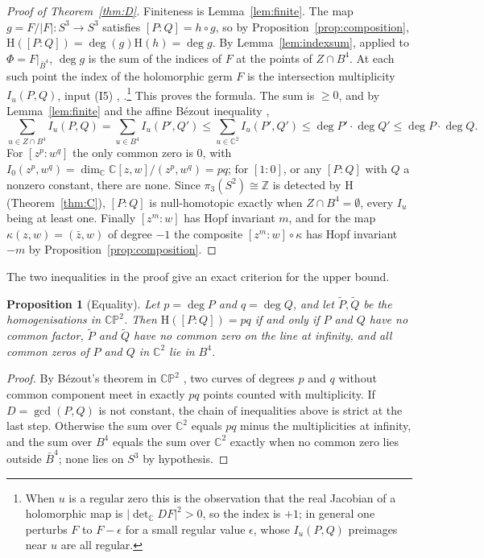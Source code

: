 \documentclass[11pt]{amsart}
\numberwithin{equation}{section}
\theoremstyle{plain}
\newtheorem{proposition}[theorem]{Proposition}
\theoremstyle{definition}
\theoremstyle{remark}
\newcommand{\C}{\mathbb{C}}
\newcommand{\Z}{\mathbb{Z}}
\newcommand{\CP}{\mathbb{CP}}
\newcommand{\Hopf}{\mathrm{H}}
\begin{document}
\begin{proof}[Proof of Theorem~\ref{thm:D}]
Finiteness is Lemma~\ref{lem:finite}. The map $g=F/|F|\colon S^3\to S^3$ satisfies $[P:Q]=h\circ g$, so by Proposition~\ref{prop:composition}, $\Hopf([P:Q])=\deg(g)\Hopf(h)=\deg g$. By Lemma~\ref{lem:indexsum}, applied to $\Phi=F|_{\bar B^4}$, $\deg g$ is the sum of the indices of $F$ at the points of $Z\cap B^4$. At each such point the index of the holomorphic germ $F$ is the intersection multiplicity $I_u(P,Q)$, input (I5) \cite[Chapter~5]{GH78}, \cite[Chapter~5]{AGV85}.\footnote{When $u$ is a regular zero this is the observation that the real Jacobian of a holomorphic map is $|\det_\C DF|^2>0$, so the index is $+1$; in general one perturbs $F$ to $F-\epsilon$ for a small regular value $\epsilon$, whose $I_u(P,Q)$ preimages near $u$ are all regular.} This proves the formula. The sum is $\ge0$, and by Lemma~\ref{lem:finite} and the affine B\'ezout inequality \cite[Section~5.3]{Ful69},
\[
\sum_{u\in Z\cap B^4}I_u(P,Q)=\sum_{u\in B^4}I_u(P',Q')\le\sum_{u\in\C^2}I_u(P',Q')\le\deg P'\cdot\deg Q'\le\deg P\cdot\deg Q .
\]
For $[z^p:w^q]$ the only common zero is $0$, with $I_0(z^p,w^q)=\dim_\C\C[z,w]/(z^p,w^q)=pq$; for $[1:0]$, or any $[P:Q]$ with $Q$ a nonzero constant, there are none. Since $\pi_3(S^2)\cong\Z$ is detected by $\Hopf$ (Theorem~\ref{thm:C}), $[P:Q]$ is null-homotopic exactly when $Z\cap B^4=\emptyset$, every $I_u$ being at least one. Finally $[z^m:w]$ has Hopf invariant $m$, and for the map $\kappa(z,w)=(\bar z,w)$ of degree $-1$ the composite $[z^m:w]\circ\kappa$ has Hopf invariant $-m$ by Proposition~\ref{prop:composition}.
\end{proof}

The two inequalities in the proof give an exact criterion for the upper bound.

\begin{proposition}[Equality]\label{prop:equality}
Let $p=\deg P$ and $q=\deg Q$, and let $\tilde P,\tilde Q$ be the homogenisations in $\CP^2$. Then $\Hopf([P:Q])=pq$ if and only if $P$ and $Q$ have no common factor, $\tilde P$ and $\tilde Q$ have no common zero on the line at infinity, and all common zeros of $P$ and $Q$ in $\C^2$ lie in $B^4$.
\end{proposition}

\begin{proof}
By B\'ezout's theorem in $\CP^2$ \cite[Section~5.3]{Ful69}, two curves of degrees $p$ and $q$ without common component meet in exactly $pq$ points counted with multiplicity. If $D=\gcd(P,Q)$ is not constant, the chain of inequalities above is strict at the last step. Otherwise the sum over $\C^2$ equals $pq$ minus the multiplicities at infinity, and the sum over $B^4$ equals the sum over $\C^2$ exactly when no common zero lies outside $\bar B^4$; none lies on $S^3$ by hypothesis.
\end{proof}
\end{document}
